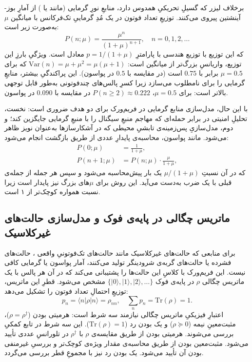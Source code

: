 برخلاف لیزر که گسیلِ تحریکیِ همدوس دارد، منابعِ نورِ گرمایی (مانند  یا ) از آمارِ بوز-آینشتین پیروی می‌کنند. توزیعِ تعداد فوتون در یک مُدِ گرماییِ تک‌فرکانس با میانگین $\mu$ به‌صورت زیر است:
\begin{equation}
	P(n;\mu) = \frac{\mu^n}{(1+\mu)^{n+1}}, \quad n = 0, 1, 2, \dots
	\label{eq:thermal-pmf}
\end{equation}
که این توزیع با توزیع هندسی با پارامترِ $p = 1/(1+\mu)$ معادل است. ویژگیِ بارزِ این توزیع، واریانسِ بزرگ‌تر از میانگین است: $\text{Var}(n) = \mu + \mu^2 = \mu(\mu+1)$ که برای $\mu = 0.5$ برابر با $0.75$ است (در مقایسه با $0.5$ در پواسون). این پراکندگیِ بیشتر، منابعِ گرمایی را برای  نامطلوب می‌سازد زیرا کسرِ پالس‌های چندفوتونی به‌طور قابل توجهی بالاتر است: برای $\mu = 0.5$، $P(n \geq 2) \approx 0.222$ در مقایسه با $0.090$ در پواسون.

با این حال، مدل‌سازی منابع گرمایی در فریم‌ورک برای دو هدف ضروری است: نخست، تحلیلِ امنیتی در برابر حمله‌ای که مهاجم منبعِ سیگنال را با منبعِ گرمایی جایگزین کند؛ و دوم، مدل‌سازیِ پس‌زمینه‌ی تابشیِ محیطی که در آشکارسازها به‌عنوان نویز ظاهر می‌شود. مانند پواسون، محاسبه‌ی پایدارِ عددی از طریق بازگشت انجام می‌شود:
\begin{align}
	P(0;\mu) &= \frac{1}{1+\mu}, \label{eq:thermal-recurrence-init} \\
	P(n+1;\mu) &= P(n;\mu) \cdot \frac{\mu}{1+\mu}, \label{eq:thermal-recurrence}
\end{align}
که در آن نسبتِ $\mu/(1+\mu)$ یک بار پیش‌محاسبه می‌شود و سپس هر جمله از جمله‌ی قبلی با یک ضرب به‌دست می‌آید. این روش برای $\mu$‌های بزرگ نیز پایدار است زیرا نسبت همواره کوچک‌تر از ۱ است.

\subsection{ماتریس چگالی در پایه‌ی فوک و مدل‌سازی حالت‌های غیرکلاسیک}

برای منابعی که حالت‌های غیرکلاسیک مانند حالت‌های تک‌فوتونیِ واقعی ، حالت‌های فشرده  یا حالت‌های گربه‌ی شرودینگر  تولید می‌کنند، آمار پواسون یا گرمایی کافی نیست. این فریم‌ورک با کلاسِ  این حالت‌ها را پشتیبانی می‌کند که در آن هر پالس با یک ماتریس چگالی $\rho$ در پایه‌ی فوک $\{|0\rangle, |1\rangle, |2\rangle, \dots\}$ مشخص می‌شود. قطرِ این ماتریس، توزیعِ احتمالِ تعداد فوتون را تشکیل می‌دهد:
\begin{equation}
	p_n = \langle n | \rho | n \rangle = \rho_{nn}, \quad \sum_n p_n = \text{Tr}(\rho) = 1.
	\label{eq:dm-diagonal-pn}
\end{equation}
اعتبارِ فیزیکیِ ماتریس چگالی نیازمند سه شرط است: هرمیتی بودن ($\rho = \rho^\dagger$)، مثبت‌معینِ نیمه ($\rho \succeq 0$) و یک بودن رد ($\text{Tr}(\rho) = 1$). این سه شرط در تابع کمکیِ  بررسی می‌شوند. هرمیتی بودن از طریق مقایسه‌ی $\rho$ با $\rho^\dagger$ در تلورانسِ عددی تأیید می‌شود. مثبت‌معین بودن از طریق محاسبه‌ی مقدار ویژه‌ی کوچک‌تر و بررسیِ غیرمنفی بودن آن تأیید می‌شود. یک بودن رد نیز با مجموعِ قطر بررسی می‌گردد.

